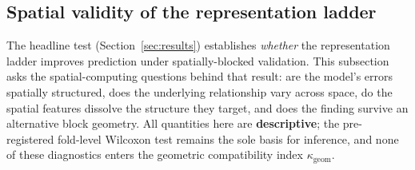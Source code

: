 %
%

\subsection{Spatial validity of the representation ladder}
\label{sec:spatial-diagnostics}

The headline test (Section~\ref{sec:results}) establishes \emph{whether} the
representation ladder improves prediction under spatially-blocked validation.
This subsection asks the spatial-computing questions behind that result: are
the model's errors spatially structured, does the underlying relationship vary
across space, do the spatial features dissolve the structure they target, and
does the finding survive an alternative block geometry. All quantities here are
\textbf{descriptive}; the pre-registered fold-level Wilcoxon test remains the
sole basis for inference, and none of these diagnostics enters the geometric
compatibility index $\kappa_{\text{geom}}$.


